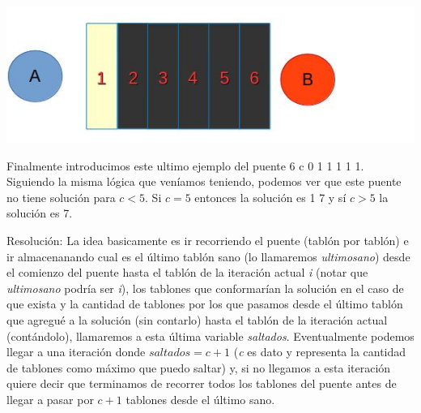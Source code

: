 \documentclass{article}
\begin{document}
\vspace{1cm}
\includegraphics[width=\textwidth,height=\textheight,keepaspectratio
]{ejemplopuentes3.jpg}
\begin {flushleft}
Finalmente introducimos este ultimo ejemplo del puente 6 c 0 1 1 1 1 1.
Siguiendo la misma l\'ogica que ven\'iamos teniendo, podemos ver que este puente no tiene soluci\'on para \textit{$c < 5$}. Si \textit{$c = 5$} entonces la soluci\'on es 1 7 y s\'i \textit{$c > 5$} la soluci\'on es 7.
\end{flushleft}
\newpage
{\noindent \Huge Resoluci\'on:}
\newline \newline
La idea basicamente es ir recorriendo el puente (tabl\'on por tabl\'on) e ir almacenanando cual es el \'ultimo tabl\'on sano (lo llamaremos \textit{ultimosano}) desde el comienzo del puente hasta el tabl\'on de la iteraci\'on actual \textit{i} (notar que \textit{ultimosano} podr\'ia ser \textit{i}), los tablones que conformar\'ian la soluci\'on en el caso de que exista y la cantidad de tablones por los que pasamos desde el \'ultimo tabl\'on que agregu\'e a la soluci\'on (sin contarlo) hasta el tabl\'on de la iteraci\'on actual (cont\'andolo), llamaremos a esta \'ultima variable \textit{saltados}.
\newline Eventualmente podemos llegar a una iteraci\'on donde \textit{$saltados = c + 1$} (\textit{c} es dato y representa la cantidad de tablones como m\'aximo que puedo saltar) y, si no llegamos a esta iteraci\'on quiere decir que terminamos de recorrer todos los tablones del puente antes de llegar a pasar por \textit{$c + 1$} tablones desde el \'ultimo sano.
\end{document}
